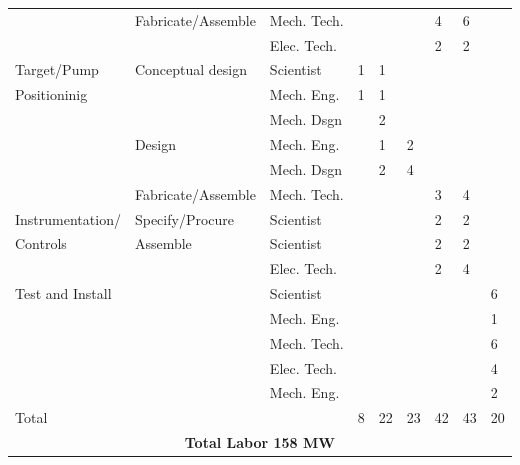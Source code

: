 \begin{table}[h]
\begin{center}
\begin{tabular}{|l|l|l|l|l|l|l|l|l|}
         & Fabricate/Assemble  &  Mech. Tech. &    &   &    & 4 & 6 &   \\  \cline{3-9}     
         &                     &  Elec. Tech. &    &   &    & 2 & 2 &   \\  \hline

Target/Pump &  Conceptual design &  Scientist   &  1  & 1  &    &    &    &   \\ \cline{3-9}
Positioninig
            &                    &  Mech. Eng.  &  1  &  1 &    &    &    &   \\ \cline{3-9}
            &                    &  Mech. Dsgn  &     &  2 &     &    &    &   \\ \cline{2-9}
            &  Design            &  Mech. Eng.  &     & 1  & 2  &    &    &   \\ \cline{3-9}
            &                    &  Mech. Dsgn  &     &  2 & 4  &    &    &    \\ \cline{2-9}
            & Fabricate/Assemble &  Mech. Tech. &     &   &    & 3  & 4    &   \\     \hline  
Instrumentation/ &Specify/Procure&  Scientist   &     &   &    &  2  & 2   &   \\ \cline{2-9}
Controls
                 & Assemble      &  Scientist   &     &   &     & 2  & 2   &   \\  \cline{3-9}  
                 &               &  Elec. Tech. &     &   &     & 2  & 4   &   \\  \hline
Test and Install &               &  Scientist   &     &   &     &    &     & 6   \\ \cline{3-9}
                 &               &  Mech. Eng.  &     &   &     &    &     & 1  \\ \cline{3-9}
                 &               &  Mech. Tech. &     &   &     &    &     & 6  \\   \cline{3-9}            
                 &               &  Elec. Tech. &     &   &     &    &     & 4  \\  \cline{3-9}                 
                 &               &  Mech. Eng.  &     &   &     &    &     & 2  \\ \hline
                 
Total            &               &              &  8  & 22 & 23 & 42 &  43 & 20  \\ \hline        
\multicolumn{9}{|c|}{\bfseries Total Labor 158 MW}\\ \hline          
\end{tabular}
\end{center}
\end{table}

